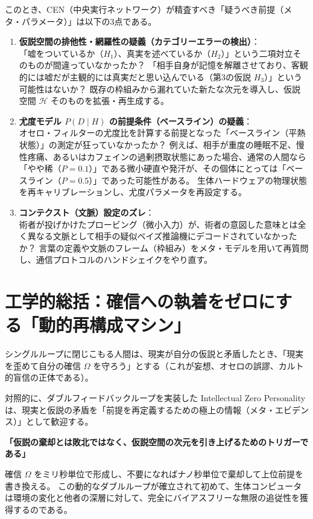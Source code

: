 このとき、CEN（中央実行ネットワーク）が精査すべき「疑うべき前提（メタ・パラメータ）」は以下の3点である。

\begin{enumerate}[label=\textbf{(\arabic*)}]
  \item \textbf{仮説空間の排他性・網羅性の疑義（カテゴリーエラーの検出）}：\\
  「嘘をついているか（$H_1$）、真実を述べているか（$H_2$）」という二項対立そのものが間違っていなかったか？
  「相手自身が記憶を解離させており、客観的には嘘だが主観的には真実だと思い込んでいる（第3の仮説 $H_3$）」という可能性はないか？
  既存の枠組みから漏れていた新たな次元を導入し、仮説空間 $\mathcal{H}$ そのものを拡張・再生成する。
  
  \item \textbf{尤度モデル $P(D \mid H)$ の前提条件（ベースライン）の疑義}：\\
  オセロ・フィルターの尤度比を計算する前提となった「ベースライン（平熱状態）」の測定が狂っていなかったか？
  例えば、相手が重度の睡眠不足、慢性疼痛、あるいはカフェインの過剰摂取状態にあった場合、通常の人間なら「やや稀（$P=0.1$）」である微小硬直や発汗が、その個体にとっては「ベースライン（$P=0.5$）」であった可能性がある。
  生体ハードウェアの物理状態を再キャリブレーションし、尤度パラメータを再設定する。

  \item \textbf{コンテクスト（文脈）設定のズレ}：\\
  術者が投げかけたプロービング（微小入力）が、術者の意図した意味とは全く異なる文脈として相手の疑似ベイズ推論機にデコードされていなかったか？
  言葉の定義や文脈のフレーム（枠組み）をメタ・モデルを用いて再質問し、通信プロトコルのハンドシェイクをやり直す。
\end{enumerate}

\section{工学的総括：確信への執着をゼロにする「動的再構成マシン」}

シングルループに閉じこもる人間は、現実が自分の仮説と矛盾したとき、「現実を歪めて自分の確信 $\Omega$ を守ろう」とする（これが妄想、オセロの誤謬、カルト的盲信の正体である）。

対照的に、ダブルフィードバックループを実装した Intellectual Zero Personality は、現実と仮説の矛盾を「前提を再定義するための極上の情報（メタ・エビデンス）」として歓迎する。
\begin{center}
\textbf{「仮説の棄却とは敗北ではなく、仮説空間の次元を引き上げるためのトリガーである」}
\end{center}
確信 $\Omega$ をミリ秒単位で形成し、不要になればナノ秒単位で棄却して上位前提を書き換える。
この動的なダブルループが確立されて初めて、生体コンピュータは環境の変化と他者の深層に対して、完全にバイアスフリーな無限の追従性を獲得するのである。


